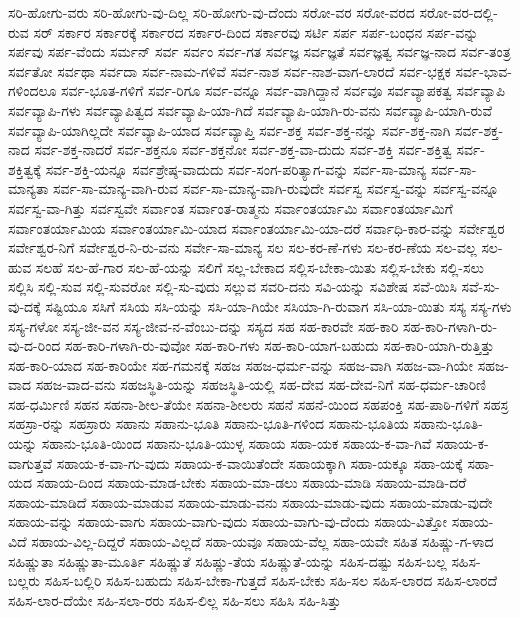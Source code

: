 {ಸರಿ-ಹೋಗು-ವರು
ಸರಿ-ಹೋಗು-ವು-ದಿಲ್ಲ
ಸರಿ-ಹೋಗು-ವು-ದೆಂದು
ಸರೋ-ವರ
ಸರೋ-ವರದ
ಸರೋ-ವರ-ದಲ್ಲಿ-ರುವ
ಸರ್
ಸರ್ಕಾರ
ಸರ್ಕಾರಕ್ಕೆ
ಸರ್ಕಾರದ
ಸರ್ಕಾರ-ದಿಂದ
ಸರ್ಕಾರವು
ಸರ್ಟಿ
ಸರ್ಪ
ಸರ್ಪ-ಬಂಧನ
ಸರ್ಪ-ವನ್ನು
ಸರ್ಪವು
ಸರ್ಪ-ವೆಂದು
ಸರ್ಮನ್
ಸರ್ವ
ಸರ್ವಂ
ಸರ್ವ-ಗತ
ಸರ್ವಜ್ಞ
ಸರ್ವಜ್ಞತೆ
ಸರ್ವಜ್ಞತ್ವ
ಸರ್ವಜ್ಞ-ನಾದ
ಸರ್ವ-ತಂತ್ರ
ಸರ್ವತೋ
ಸರ್ವಥಾ
ಸರ್ವದಾ
ಸರ್ವ-ನಾಮ-ಗಳಿವೆ
ಸರ್ವ-ನಾಶ
ಸರ್ವ-ನಾಶ-ವಾಗ-ಲಾರದೆ
ಸರ್ವ-ಭಕ್ಷಕ
ಸರ್ವ-ಭಾವ-ಗಳಿಂದಲೂ
ಸರ್ವ-ಭೂತ-ಗಳಿಗೆ
ಸರ್ವ-ರಿಗೂ
ಸರ್ವ-ವನ್ನೂ
ಸರ್ವ-ವಾಗಿದ್ದಾನೆ
ಸರ್ವವೂ
ಸರ್ವವ್ಯಾಪಕತ್ವ
ಸರ್ವವ್ಯಾಪಿ
ಸರ್ವವ್ಯಾಪಿ-ಗಳು
ಸರ್ವವ್ಯಾಪಿತ್ವದ
ಸರ್ವವ್ಯಾಪಿ-ಯಾ-ಗಿದೆ
ಸರ್ವವ್ಯಾಪಿ-ಯಾಗಿ-ರು-ವನು
ಸರ್ವವ್ಯಾಪಿ-ಯಾಗಿ-ರುವೆ
ಸರ್ವವ್ಯಾಪಿ-ಯಾಗಿಲ್ಲದೇ
ಸರ್ವವ್ಯಾಪಿ-ಯಾದ
ಸರ್ವವ್ಯಾಪ್ತಿ
ಸರ್ವ-ಶಕ್ತ
ಸರ್ವ-ಶಕ್ತ-ನನ್ನು
ಸರ್ವ-ಶಕ್ತ-ನಾಗಿ
ಸರ್ವ-ಶಕ್ತ-ನಾದ
ಸರ್ವ-ಶಕ್ತ-ನಾದರೆ
ಸರ್ವ-ಶಕ್ತನೂ
ಸರ್ವ-ಶಕ್ತನೋ
ಸರ್ವ-ಶಕ್ತ-ವಾ-ದುದು
ಸರ್ವ-ಶಕ್ತಿ
ಸರ್ವ-ಶಕ್ತಿತ್ವ
ಸರ್ವ-ಶಕ್ತಿತ್ವಕ್ಕೆ
ಸರ್ವ-ಶಕ್ತಿ-ಯನ್ನೂ
ಸರ್ವಶ್ರೇಷ್ಠ-ವಾದುದು
ಸರ್ವ-ಸಂಗ-ಪರಿತ್ಯಾಗ-ವನ್ನು
ಸರ್ವ-ಸಾ-ಮಾನ್ಯ
ಸರ್ವ-ಸಾ-ಮಾನ್ಯತಾ
ಸರ್ವ-ಸಾ-ಮಾನ್ಯ-ವಾಗಿ-ರುವ
ಸರ್ವ-ಸಾ-ಮಾನ್ಯ-ವಾಗಿ-ರುವುದೇ
ಸರ್ವಸ್ವ
ಸರ್ವಸ್ವ-ವನ್ನು
ಸರ್ವಸ್ವ-ವನ್ನೂ
ಸರ್ವಸ್ವ-ವಾ-ಗಿತ್ತು
ಸರ್ವಸ್ವವೇ
ಸರ್ವಾಂತ
ಸರ್ವಾಂತ-ರಾತ್ಮನು
ಸರ್ವಾಂತರ್ಯಾಮಿ
ಸರ್ವಾಂತರ್ಯಾಮಿಗೆ
ಸರ್ವಾಂತರ್ಯಾಮಿಯ
ಸರ್ವಾಂತರ್ಯಾಮಿ-ಯಾದ
ಸರ್ವಾಂತರ್ಯಾಮಿ-ಯಾ-ದರೆ
ಸರ್ವಾಧಿ-ಕಾರ-ವನ್ನು
ಸರ್ವೇಶ್ವರ
ಸರ್ವೇಶ್ವರ-ನಿಗೆ
ಸರ್ವೇಶ್ವರ-ನಿ-ರು-ವನು
ಸರ್ವೇ-ಸಾ-ಮಾನ್ಯ
ಸಲ
ಸಲ-ಕರ-ಣೆ-ಗಳು
ಸಲ-ಕರ-ಣೆಯ
ಸಲ-ವಲ್ಲ
ಸಲ-ಹುವ
ಸಲಹೆ
ಸಲ-ಹೆ-ಗಾರ
ಸಲ-ಹೆ-ಯನ್ನು
ಸಲಿಗೆ
ಸಲ್ಲ-ಬೇಕಾದ
ಸಲ್ಲಿಸ-ಬೇಕಾ-ಯಿತು
ಸಲ್ಲಿಸ-ಬೇಕು
ಸಲ್ಲಿ-ಸಲು
ಸಲ್ಲಿಸಿ
ಸಲ್ಲಿ-ಸುವ
ಸಲ್ಲಿ-ಸುವರೋ
ಸಲ್ಲಿ-ಸು-ವುದು
ಸಲ್ಲುವ
ಸವರಿ-ದನು
ಸವಿ-ಯನ್ನು
ಸವಿಶೇಷ
ಸವೆ-ಯಿಸಿ
ಸವೆ-ಸು-ವು-ದಕ್ಕೆ
ಸಷ್ಟಿಯೂ
ಸಸಿಗೆ
ಸಸಿಯ
ಸಸಿ-ಯನ್ನು
ಸಸಿ-ಯಾ-ಗಿಯೇ
ಸಸಿಯಾ-ಗಿ-ರುವಾಗ
ಸಸಿ-ಯಾ-ಯಿತು
ಸಸ್ಯ
ಸಸ್ಯ-ಗಳು
ಸಸ್ಯ-ಗಳೋ
ಸಸ್ಯ-ಜೀ-ವನ
ಸಸ್ಯ-ಜೀವ-ನ-ವೆಂಬು-ದನ್ನು
ಸಸ್ಯದ
ಸಹ
ಸಹ-ಕಾರವೇ
ಸಹ-ಕಾರಿ
ಸಹ-ಕಾರಿ-ಗಳಾಗಿ-ರು-ವು-ದ-ರಿಂದ
ಸಹ-ಕಾರಿ-ಗಳಾಗಿ-ರು-ವುವೋ
ಸಹ-ಕಾರಿ-ಗಳು
ಸಹ-ಕಾರಿ-ಯಾಗ-ಬಹುದು
ಸಹ-ಕಾರಿ-ಯಾಗಿ-ರುತ್ತಿತ್ತು
ಸಹ-ಕಾರಿ-ಯಾದ
ಸಹ-ಕಾರಿಯೇ
ಸಹ-ಗಮನಕ್ಕೆ
ಸಹಜ
ಸಹಜ-ಧರ್ಮ-ವನ್ನು
ಸಹಜ-ವಾಗಿ
ಸಹಜ-ವಾ-ಗಿಯೇ
ಸಹಜ-ವಾದ
ಸಹಜ-ವಾದ-ವನು
ಸಹಜಸ್ಥಿತಿ-ಯನ್ನು
ಸಹಜಸ್ಥಿತಿ-ಯಲ್ಲಿ
ಸಹ-ದೇವ
ಸಹ-ದೇವ-ನಿಗೆ
ಸಹ-ಧರ್ಮ-ಚಾರಿಣಿ
ಸಹ-ಧರ್ಮಿಣಿ
ಸಹನ
ಸಹನಾ-ಶೀಲ-ತೆಯೇ
ಸಹನಾ-ಶೀಲರು
ಸಹನೆ
ಸಹನೆ-ಯಿಂದ
ಸಹಪಂಕ್ತಿ
ಸಹ-ಪಾಠಿ-ಗಳಿಗೆ
ಸಹಸ್ರ
ಸಹಸ್ರಾ-ರನ್ನು
ಸಹಸ್ರಾರು
ಸಹಾನು
ಸಹಾನು-ಭೂತಿ
ಸಹಾನು-ಭೂತಿ-ಗಳಿಂದ
ಸಹಾನು-ಭೂತಿಯ
ಸಹಾನು-ಭೂತಿ-ಯನ್ನು
ಸಹಾನು-ಭೂತಿ-ಯಿಂದ
ಸಹಾನು-ಭೂತಿ-ಯುಳ್ಳ
ಸಹಾಯ
ಸಹಾ-ಯಕ
ಸಹಾಯ-ಕ-ವಾ-ಗಿವೆ
ಸಹಾಯ-ಕ-ವಾಗುತ್ತವೆ
ಸಹಾಯ-ಕ-ವಾ-ಗು-ವುದು
ಸಹಾಯ-ಕ-ವಾಯಿತೆಂದೇ
ಸಹಾಯಕ್ಕಾಗಿ
ಸಹಾ-ಯಕ್ಕೂ
ಸಹಾ-ಯಕ್ಕೆ
ಸಹಾ-ಯದ
ಸಹಾಯ-ದಿಂದ
ಸಹಾಯ-ಮಾಡ-ಬೇಕು
ಸಹಾಯ-ಮಾ-ಡಲು
ಸಹಾಯ-ಮಾಡಿ
ಸಹಾಯ-ಮಾಡಿ-ದರೆ
ಸಹಾಯ-ಮಾಡಿದೆ
ಸಹಾಯ-ಮಾಡುವ
ಸಹಾಯ-ಮಾಡು-ವನು
ಸಹಾಯ-ಮಾಡು-ವುದು
ಸಹಾಯ-ಮಾಡು-ವುದೇ
ಸಹಾಯ-ವನ್ನು
ಸಹಾಯ-ವಾಗು
ಸಹಾಯ-ವಾಗು-ವುದು
ಸಹಾಯ-ವಾಗು-ವು-ದೆಂದು
ಸಹಾಯ-ವಿತ್ತೋ
ಸಹಾಯ-ವಿದೆ
ಸಹಾಯ-ವಿಲ್ಲ-ದಿದ್ದರೆ
ಸಹಾಯ-ವಿಲ್ಲದೆ
ಸಹಾ-ಯವೂ
ಸಹಾಯ-ವೆಲ್ಲ
ಸಹಾ-ಯವೇ
ಸಹಿತ
ಸಹಿಷ್ಣು-ಗ-ಳಾದ
ಸಹಿಷ್ಣುತಾ
ಸಹಿಷ್ಣುತಾ-ಮೂರ್ತಿ
ಸಹಿಷ್ಣುತೆ
ಸಹಿಷ್ಣು-ತೆಯ
ಸಹಿಷ್ಣುತೆ-ಯನ್ನು
ಸಹಿಸ-ದಷ್ಟು
ಸಹಿಸ-ಬಲ್ಲ
ಸಹಿಸ-ಬಲ್ಲರು
ಸಹಿಸ-ಬಲ್ಲಿರಿ
ಸಹಿಸ-ಬಹುದು
ಸಹಿಸ-ಬೇಕಾ-ಗುತ್ತದೆ
ಸಹಿಸ-ಬೇಕು
ಸಹಿ-ಸಲ
ಸಹಿಸ-ಲಾರದ
ಸಹಿಸ-ಲಾರದೆ
ಸಹಿಸ-ಲಾರ-ದೆಯೇ
ಸಹಿ-ಸಲಾ-ರರು
ಸಹಿಸ-ಲಿಲ್ಲ
ಸಹಿ-ಸಲು
ಸಹಿಸಿ
ಸಹಿ-ಸಿತ್ತು
}
